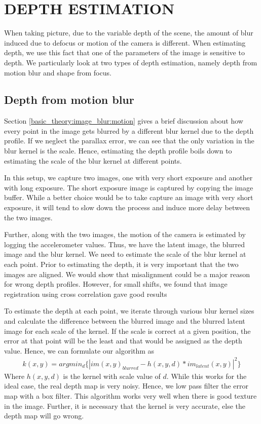 \documentclass[BTech]{iitmdiss}
\begin{document}
\chapter{DEPTH ESTIMATION}
\label{chap:depth_estimation}
When taking picture, due to the variable depth of the scene, the amount 
of blur induced due to defocus or motion of the camera is different. 
When estimating depth, we use this fact that one of the parameters of 
the image is sensitive to depth. We particularly look at two types of 
depth estimation, namely depth from motion blur and shape from focus.

\section{Depth from motion blur}
\label{depth_estimation:motion}
Section \ref{basic_theory:image_blur:motion} gives a brief discussion 
about how every point in the image gets blurred by a different blur 
kernel due to the depth profile. If we neglect the parallax error, we 
can see that the only variation in the blur kernel is the scale. Hence,
estimating the depth profile boils down to estimating the scale of the 
blur kernel at different points. 

In this setup, we capture two images, one with very short exposure and
another with long exposure. The short exposure image is captured by
copying the image buffer. While a better choice would be to take capture
an image with very short exposure, it will tend to slow down the process
and induce more delay between the two images. 

Further, along with the two images, the motion of the camera is 
estimated by logging the accelerometer values. Thus, we have the latent
image, the blurred image and the blur kernel. We need to estimate the 
scale of the blur kernel at each point. Prior to estimating the depth,
it is very important that the two images are aligned. We would show that
misalignment could be a major reason for wrong depth profiles. However,
for small shifts, we found that image registration using cross 
correlation gave good results

To estimate the depth at each point, we iterate through various blur
kernel sizes and calculate the difference between the blurred image and
the blurred latent image for each scale of the kernel. If the scale is
correct at a given position, the error at that point will be the least
and that would be assigned as the depth value. Hence, we can formulate
our algorithm as
\begin{align*}
k(x,y) = argmin_d\{|im(x,y)_{blurred}-h(x,y,d)*im_{latent}(x,y)|^2\}
\end{align*}
Where $h(x,y,d)$ is the kernel with scale value of $d$. While this works
for the ideal case, the real depth map is very noisy. Hence, we low pass
filter the error map with a box filter. This algorithm works very well
when there is good texture in the image. Further, it is necessary that
the kernel is very accurate, else the depth map will go wrong. 
\end{document}

